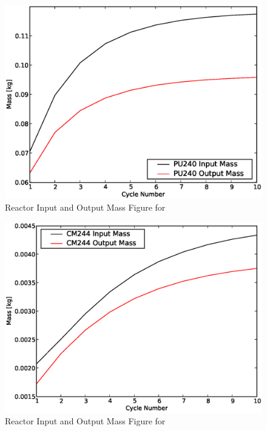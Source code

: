 \begin{figure}[htbp]
\caption{Reactor Input and Output Mass Figure for }
\label{1g_fig24}
\begin{center}
\includegraphics[scale=0.5]{one_group_method/figs/Fig24.eps}
\end{center}
\end{figure}

\begin{figure}[htbp]
\caption{Reactor Input and Output Mass Figure for }
\label{1g_fig25}
\begin{center}
\includegraphics[scale=0.5]{one_group_method/figs/Fig25.eps}
\end{center}
\end{figure}

